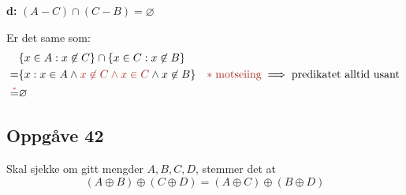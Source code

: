 \documentclass[a4paper, 11pt]{article}
\newcommand{\ceq}[2]{\stackrel{\text{\tiny{#1}}}{#2}}
\newcommand{\deloppg}[1]{\vspace{1mm}\noindent \textbf{\themecolor{#1:}}}
\newcommand{\themeshade}{Mahogany}
\newcommand{\themecolor}[1]{\textcolor{\themeshade}{#1}}
\begin{document}
\deloppg{d} \( (A - C) \cap (C - B) = \varnothing\)

\noindent Er det same som:
\begin{align*}
    &\{x \in A : x \not\in C\} \cap \{x \in C : x \not\in B\} \\
    =&\{x: x \in A \land \themecolor{x \not\in C \land x \in C} \land x \not\in B \}
       \quad \themecolor{*}\; \text{\themecolor{motseiing}}\implies\text{predikatet alltid usant}\\
    \ceq{\themecolor{\(*\)}}{=}& \varnothing
\end{align*}


\newpage
\subsection*{Oppgåve 42} %
Skal sjekke om gitt mengder \(A,B,C,D\), stemmer det at
\[
    (A \oplus B) \oplus (C \oplus D) = (A \oplus C) \oplus (B \oplus D)
\]
\end{document}
